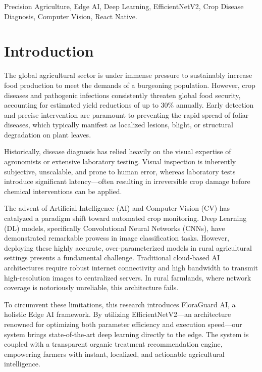 \documentclass[conference]{IEEEtran}
\begin{document}
\begin{IEEEkeywords}
Precision Agriculture, Edge AI, Deep Learning, EfficientNetV2, Crop Disease Diagnosis, Computer Vision, React Native.
\end{IEEEkeywords}

\section{Introduction}
The global agricultural sector is under immense pressure to sustainably increase food production to meet the demands of a burgeoning population. However, crop diseases and pathogenic infections consistently threaten global food security, accounting for estimated yield reductions of up to 30\% annually. Early detection and precise intervention are paramount to preventing the rapid spread of foliar diseases, which typically manifest as localized lesions, blight, or structural degradation on plant leaves.

Historically, disease diagnosis has relied heavily on the visual expertise of agronomists or extensive laboratory testing. Visual inspection is inherently subjective, unscalable, and prone to human error, whereas laboratory tests introduce significant latency—often resulting in irreversible crop damage before chemical interventions can be applied. 

The advent of Artificial Intelligence (AI) and Computer Vision (CV) has catalyzed a paradigm shift toward automated crop monitoring. Deep Learning (DL) models, specifically Convolutional Neural Networks (CNNs), have demonstrated remarkable prowess in image classification tasks. However, deploying these highly accurate, over-parameterized models in rural agricultural settings presents a fundamental challenge. Traditional cloud-based AI architectures require robust internet connectivity and high bandwidth to transmit high-resolution images to centralized servers. In rural farmlands, where network coverage is notoriously unreliable, this architecture fails.

To circumvent these limitations, this research introduces FloraGuard AI, a holistic Edge AI framework. By utilizing EfficientNetV2—an architecture renowned for optimizing both parameter efficiency and execution speed—our system brings state-of-the-art deep learning directly to the edge. The system is coupled with a transparent organic treatment recommendation engine, empowering farmers with instant, localized, and actionable agricultural intelligence.
\end{document}
